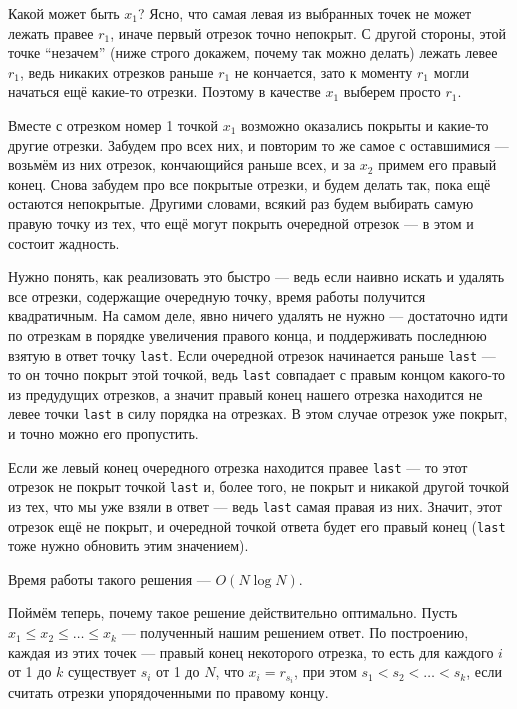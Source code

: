 \documentclass[12pt]{article}
\theoremstyle{definition}
\begin{document}
Какой может быть $x_1$? Ясно, что самая левая из выбранных точек не может лежать правее $r_1$, иначе первый отрезок точно непокрыт. С другой стороны, этой точке ``незачем'' (ниже строго докажем, почему так можно делать)
лежать левее $r_1$, ведь никаких отрезков раньше $r_1$ не кончается, зато к моменту $r_1$ могли начаться ещё какие-то отрезки. Поэтому в качестве $x_1$ выберем просто $r_1$.

Вместе с отрезком номер 1 точкой $x_1$ возможно оказались покрыты и какие-то другие отрезки. Забудем про всех них, и повторим то же самое с оставшимися --- возьмём из них отрезок, кончающийся раньше всех, и за $x_2$ примем его правый конец. Снова забудем про все покрытые отрезки, и будем делать так, пока ещё остаются непокрытые. Другими словами, всякий раз будем
выбирать самую правую точку из тех, что ещё могут покрыть очередной отрезок --- в этом и состоит жадность.

Нужно понять, как реализовать это быстро --- ведь если наивно искать и удалять все отрезки, содержащие очередную точку, время работы получится квадратичным. На самом деле, явно ничего удалять
не нужно --- достаточно идти по отрезкам в порядке увеличения правого конца, и поддерживать последнюю взятую в ответ точку \verb|last|.
Если очередной отрезок начинается раньше \verb|last| --- то он точно покрыт этой точкой, ведь \verb|last| совпадает с правым концом какого-то из предудущих отрезков, а значит правый конец
нашего отрезка находится не левее точки \verb|last| в силу порядка на отрезках. В этом случае отрезок уже покрыт, и точно можно его пропустить.

Если же левый конец очередного отрезка находится правее \verb|last| --- то этот отрезок не покрыт точкой \verb|last| и, более того, не покрыт и никакой другой точкой из тех,
что мы уже взяли в ответ --- ведь \verb|last| самая правая из них. Значит, этот отрезок ещё не покрыт, и очередной точкой ответа будет его правый конец (\verb|last| тоже нужно обновить этим значением).

Время работы такого решения --- $O(N \log N)$.

Поймём теперь, почему такое решение действительно оптимально. Пусть $x_1 \le x_2 \le \dots \le x_k$ --- полученный нашим решением ответ. По построению, каждая из этих точек
--- правый конец некоторого отрезка, то есть для каждого $i$ от 1 до $k$ существует $s_i$ от 1 до $N$, что $x_i = r_{s_i}$, при этом $s_1 < s_2 < \dots < s_k$, если
считать отрезки упорядоченными по правому концу.
\end{document}
